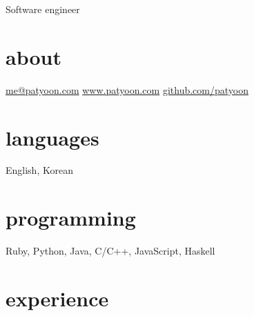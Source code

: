 \documentclass[]{patyoon-cv}
\begin{document}
{Software engineer}

\begin{aside}
  \section{about}
  \href{mailto:me@patyoon.com}{me@patyoon.com}
  \href{https://patyoon.com}{www.patyoon.com}
  \href{http://github.com/patyoon}{github.com/patyoon}
  \section{languages}
  English, Korean
  \section{programming}
  Ruby, Python,
  Java, C/C++,
  JavaScript,
  Haskell
\end{aside}

\section{experience}
\end{document}
